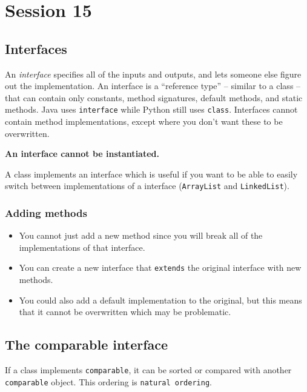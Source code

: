 \section{Session 15}\label{sec:session_15}

\subsection{Interfaces}\label{sub:interfaces}

An \emph{interface} specifies all of the inputs and outputs, and lets someone else figure out the implementation.
An interface is a ``reference type'' -- similar to a class -- that can contain only constants, method signatures, default methods, and static methods.
Java uses \texttt{interface} while Python still uses \texttt{class}.
Interfaces cannot contain method implementations, except where you don't want these to be overwritten.

\textbf{An interface cannot be instantiated.}

A class implements an interface which is useful if you want to be able to easily switch between implementations of a interface (\texttt{ArrayList} and \texttt{LinkedList}).

\subsubsection{Adding methods}\label{ssub:adding_methods}

\begin{itemize}
	\item You cannot just add a new method since you will break all of the implementations of that interface.
	\item You can create a new interface that \texttt{extends} the original interface with new methods.
	\item You could also add a default implementation to the original, but this means that it cannot be overwritten which may be problematic.
\end{itemize}

\subsection{The comparable interface}\label{sub:the_comparable_interface}

If a class implements \texttt{comparable}, it can be sorted or compared with another \texttt{comparable} object.
This ordering is \texttt{natural ordering}.

